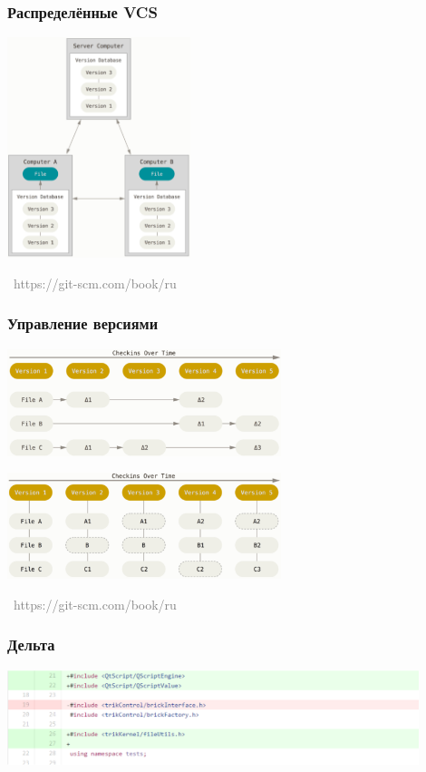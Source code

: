 \documentclass[xetex,mathserif,serif]{beamer}
\newcommand{\attribution}[1] {
    \vspace{-5mm}\begin{flushright}\begin{scriptsize}\textcolor{gray}{\textcopyright\, #1}\end{scriptsize}\end{flushright}
}
\begin{document}
    \begin{frame}
        \frametitle{Распределённые VCS}
        \begin{center}
            \includegraphics[width=0.4\textwidth]{distributedVcs.png}
            \attribution{https://git-scm.com/book/ru}
        \end{center}
    \end{frame}

    \begin{frame}
        \frametitle{Управление версиями}
        \begin{center}
            \includegraphics[width=0.6\textwidth]{deltaVersioning.png}

            \vspace{5mm}
            \includegraphics[width=0.6\textwidth]{snapshotVersioning.png}
            \attribution{https://git-scm.com/book/ru}
        \end{center}
    \end{frame}

    \begin{frame}
        \frametitle{Дельта}
        \begin{center}
            \includegraphics[width=0.9\textwidth]{delta.png}
        \end{center}
    \end{frame}
\end{document}
